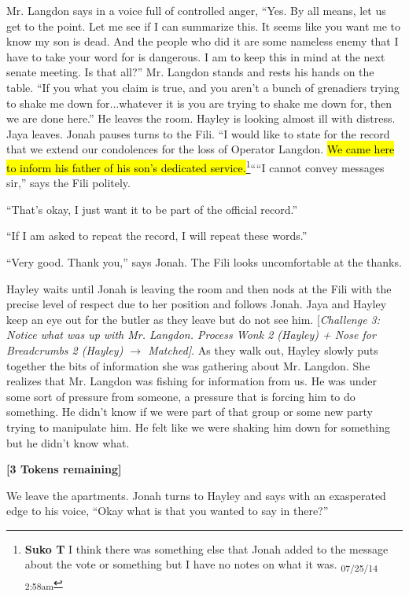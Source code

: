 Mr. Langdon says in a voice full of controlled anger, ``Yes. By all means, let us get to the point.  Let me see if I can summarize this.  It seems like you want me to know my son is dead.  And the people who did it are some nameless enemy that I have to take your word for is dangerous.  I am to keep this in mind at the next senate meeting.  Is that all?''  Mr. Langdon stands and rests his hands on the table.  ``If you what you claim is true, and you aren't a bunch of grenadiers trying to shake me down for...whatever it is you are trying to shake me down for, then we are done here.''  He leaves the room.  Hayley is looking almost ill with distress.  Jaya leaves.  Jonah pauses turns to the Fili.  ``I would like to state for the record that we extend our condolences for the loss of Operator Langdon.  \hl{We came here to inform his father of his son's dedicated service.}\footnote{\textbf{Suko T }I think there was something else that Jonah added to the message about the vote or something but I have no notes on what it was. \textsubscript{07/25/14 2:58am}}````I cannot convey messages sir,'' says the Fili politely.

``That's okay, I just want it to be part of the official record.''

``If I am asked to repeat the record, I will repeat these words.''

``Very good.  Thank you,'' says Jonah.  The Fili looks uncomfortable at the thanks.

Hayley waits until Jonah is leaving the room and then nods at the Fili with the precise level of respect due to her position and follows Jonah.  Jaya and Hayley keep an eye out for the butler as they leave but do not see him.  {[}\textit{Challenge 3: Notice what was up with Mr. Langdon.  Process Wonk 2 (Hayley) + Nose for Breadcrumbs 2 (Hayley) $\rightarrow$ Matched{]}}. As they walk out, Hayley slowly puts together the bits of information she was gathering about Mr. Langdon.  She realizes that Mr. Langdon was fishing for information from us.  He was under some sort of pressure from someone, a pressure that is forcing him to do something.  He didn't know if we were part of that group or some new party trying to manipulate him.  He felt like we were shaking him down for something but he didn't know what.



\textbf{{[}3 Tokens remaining{]}}



We leave the apartments.  Jonah turns to Hayley and says with an exasperated edge to his voice, ``Okay what is that you wanted to say in there?''

